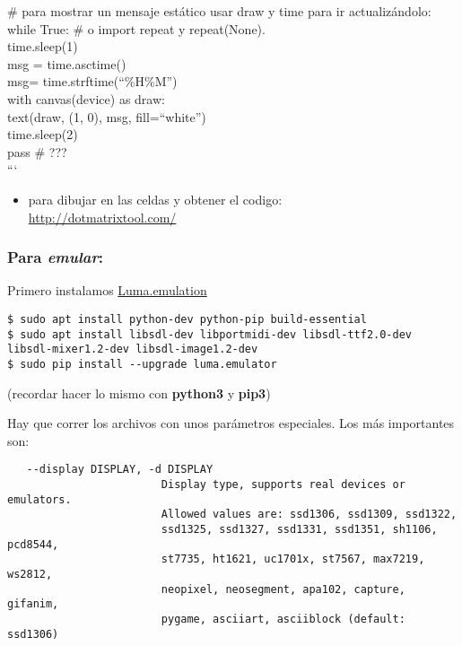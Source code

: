 \# para mostrar un mensaje estático usar draw y time para ir
actualizándolo:\\ while True: \# o import repeat y repeat(None).\\
time.sleep(1)\\ msg = time.asctime()\\ msg= time.strftime(``\%H\%M'')\\
with canvas(device) as draw:\\ text(draw, (1, 0), msg, fill=``white'')\\
time.sleep(2)\\ pass \# ???\\ ```

\begin{itemize}
\itemsep1pt\parskip0pt
\item
  para dibujar en las celdas y obtener el codigo:\\
  \url{http://dotmatrixtool.com/}
\end{itemize}

\subsubsection{Para \emph{emular}:}\label{para-emular}

Primero instalamos
\href{https://luma-emulator.readthedocs.io/en/latest/index.html}{Luma.emulation}

\begin{verbatim}
$ sudo apt install python-dev python-pip build-essential
$ sudo apt install libsdl-dev libportmidi-dev libsdl-ttf2.0-dev libsdl-mixer1.2-dev libsdl-image1.2-dev
$ sudo pip install --upgrade luma.emulator
\end{verbatim}

(recordar hacer lo mismo con \textbf{python3} y \textbf{pip3})

Hay que correr los archivos con unos parámetros especiales. Los más
importantes son:

\begin{verbatim}
   --display DISPLAY, -d DISPLAY
                        Display type, supports real devices or emulators.
                        Allowed values are: ssd1306, ssd1309, ssd1322,
                        ssd1325, ssd1327, ssd1331, ssd1351, sh1106, pcd8544,
                        st7735, ht1621, uc1701x, st7567, max7219, ws2812,
                        neopixel, neosegment, apa102, capture, gifanim,
                        pygame, asciiart, asciiblock (default: ssd1306)
\end{verbatim}

